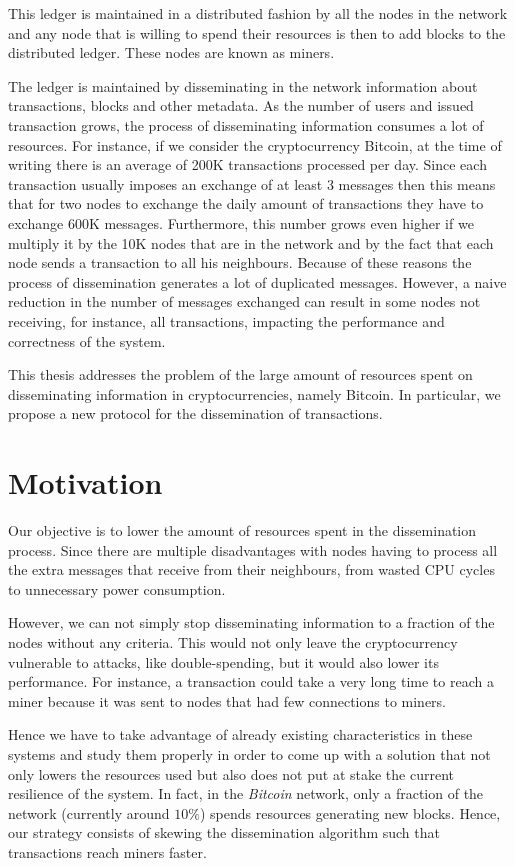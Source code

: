 This ledger is maintained in a distributed fashion by all the nodes in the network and any node that is willing to spend their resources is then to add blocks to the distributed ledger. These nodes are known as miners. 

The ledger is maintained by disseminating in the network information about transactions, blocks and other metadata. As the number of users and issued transaction grows, the process of disseminating information consumes a lot of resources. For instance, if we consider the cryptocurrency  Bitcoin, at the time of writing there is an average of 200K transactions processed per day. Since each transaction usually imposes an exchange of at least 3 messages then this means that for two nodes to exchange the daily amount of transactions they have to exchange 600K messages. Furthermore, this number grows even higher if we multiply it by the 10K nodes that are in the network and by the fact that each node sends a transaction to all his neighbours. Because of these reasons the process of dissemination generates a lot of duplicated messages. However, a naive reduction in the number of messages exchanged can result in some nodes not receiving, for instance, all transactions, impacting the performance and correctness of the system.

This thesis addresses the problem of the large amount of resources spent on disseminating information in cryptocurrencies, namely Bitcoin. In particular, we propose a new protocol for the dissemination of transactions.

\section{Motivation}
\label{sec:motivation}

Our objective is to lower the amount of resources spent in the dissemination process. Since there are multiple disadvantages with nodes having to process all the extra messages that receive from their neighbours, from wasted CPU cycles to unnecessary power consumption.

However, we can not simply stop disseminating information to a fraction of the nodes without any criteria. This would not only leave the cryptocurrency vulnerable to attacks, like double-spending, but it would also lower its performance. For instance, a transaction could take a very long time to reach a miner because it was sent to nodes that had few connections to miners. 

Hence we have to take advantage of already existing characteristics in these systems and study them properly in order to come up with a solution that not only lowers the resources used but also does not put at stake the current resilience of the system. In fact, in the \textit{Bitcoin} network, only a fraction of the network (currently around $10\%$) spends resources generating new blocks. Hence, our strategy consists of skewing the dissemination algorithm such that transactions reach miners faster.


